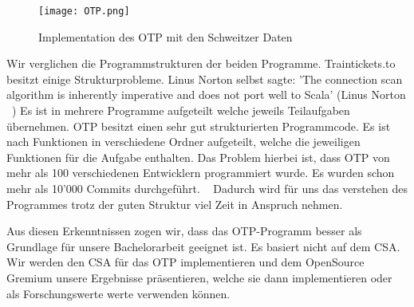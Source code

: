 \begin{figure}[]
	\centering
	\texttt{[image: OTP.png]}
	\caption{Implementation des OTP mit den Schweitzer Daten}
	\label{fig:OTP}
\end{figure}

Wir verglichen die Programmstrukturen der beiden Programme. Traintickets.to besitzt einige Strukturprobleme. Linus Norton selbst sagte: 'The connection scan algorithm is inherently imperative and does not port well to Scala' (Linus Norton ~\cite{traintickets_git_pattern}) Es ist in mehrere Programme aufgeteilt welche jeweils Teilaufgaben übernehmen. OTP besitzt einen sehr gut strukturierten Programmcode. Es ist nach Funktionen in verschiedene Ordner aufgeteilt, welche die jeweiligen Funktionen für die Aufgabe enthalten. Das Problem hierbei ist, dass OTP von mehr als 100 verschiedenen Entwicklern programmiert wurde. Es wurden schon mehr als 10'000 Commits durchgeführt. ~\cite{otp_website} Dadurch wird für uns das verstehen des Programmes trotz der guten Struktur viel Zeit in Anspruch nehmen. 

Aus diesen Erkenntnissen zogen wir, dass das OTP-Programm besser als Grundlage für unsere Bachelorarbeit geeignet ist. Es basiert nicht auf dem CSA. Wir werden den CSA für das OTP implementieren und dem OpenSource Gremium unsere Ergebnisse präsentieren, welche sie dann implementieren oder als Forschungswerte werte verwenden können.
 

